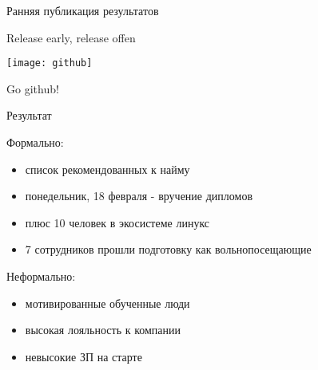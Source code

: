 \begin{frame}{Ранняя публикация результатов}

  \Large
  \begin{center}
    \alert{Release early, release offen} 

    \texttt{[image: github]}

    \alert{Go github!}
  \end{center}
  
\end{frame}

\begin{frame}{Результат}
  \begin{center}
    \large 
    Формально:
    \begin{itemize}
      \item список рекомендованных к найму 
      \item понедельник, 18 февраля - вручение дипломов  
      \item плюс 10 человек в экосистеме линукс
      \item 7 сотрудников прошли подготовку как вольнопосещающие
    \end{itemize} \pause

    Неформально:
    \begin{itemize}
      \item мотивированные обученные люди 
      \item высокая лояльность к компании
      \item невысокие ЗП на старте
    \end{itemize}
  \end{center}
\end{frame}
